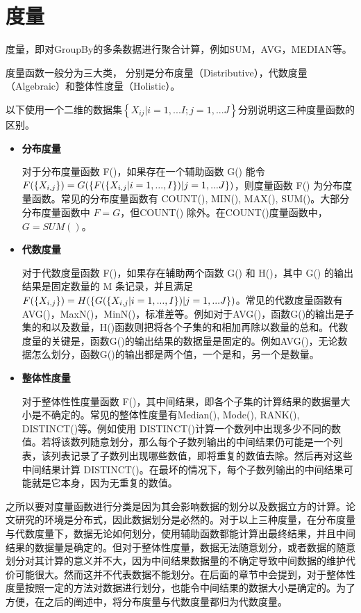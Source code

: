 \section{度量}

度量，即对GroupBy的多条数据进行聚合计算，例如SUM，AVG，MEDIAN等。

度量函数一般分为三大类， 分别是分布度量（Distributive），代数度量（Algebraic）和整体性度量（Holistic）。

以下使用一个二维的数据集$\left\{ {X}_{ij}|i=1,...I; j=1,...J \right\}$分别说明这三种度量函数的区别。

\begin{itemize}

\item \textbf{分布度量}

对于分布度量函数 F()，如果存在一个辅助函数 G() 能令 $F(\text\{ {X}_{i,j} \text\}) = G(\text\{ F(\text\{ {X}_{i,j}|i=1,...,I \text\})|j=1,...J \text\})$，则度量函数 F() 为分布度量函数。常见的分布度量函数有 COUNT(), MIN(), MAX(), SUM()。大部分分布度量函数中 $F=G$，但COUNT() 除外。在COUNT()度量函数中，$G=SUM()$。

\item \textbf{代数度量}

对于代数度量函数 F()，如果存在辅助两个函数 G() 和 H()，其中 G() 的输出结果是固定数量的 M 条记录，并且满足$F(\text\{ {X}_{i,j} \text\}) = H(\text\{ G(\text\{ {X}_{i,j}|i=1,...,I \text\})|j=1,...J \text\})$。常见的代数度量函数有AVG()，MaxN()，MinN()，标准差等。例如对于AVG()，函数G()的输出是子集的和以及数量，H()函数则把将各个子集的和相加再除以数量的总和。代数度量的关键是，函数G()的输出结果的数据量是固定的。例如AVG()，无论数据怎么划分，函数G()的输出都是两个值，一个是和，另一个是数量。

\item \textbf{整体性度量}

对于整体性性度量函数 F()，其中间结果，即各个子集的计算结果的数据量大小是不确定的。常见的整体性度量有Median(), Mode(), RANK(), DISTINCT()等。例如使用 DISTINCT()计算一个数列中出现多少不同的数值。若将该数列随意划分，那么每个子数列输出的中间结果仍可能是一个列表，该列表记录了子数列出现哪些数值，即将重复的数值去除。然后再对这些中间结果计算 DISTINCT()。在最坏的情况下，每个子数列输出的中间结果可能就是它本身，因为无重复的数值。

\end{itemize}

之所以要对度量函数进行分类是因为其会影响数据的划分以及数据立方的计算。论文研究的环境是分布式，因此数据划分是必然的。对于以上三种度量，在分布度量与代数度量下，数据无论如何划分，使用辅助函数都能计算出最终结果，并且中间结果的数据量是确定的。但对于整体性度量，数据无法随意划分，或者数据的随意划分对其计算的意义并不大，因为中间结果数据量的不确定导致中间数据的维护代价可能很大。然而这并不代表数据不能划分。在后面的章节中会提到，对于整体性度量按照一定的方法对数据进行划分，也能令中间结果的数据大小是确定的。为了方便，在之后的阐述中，将分布度量与代数度量都归为代数度量。

